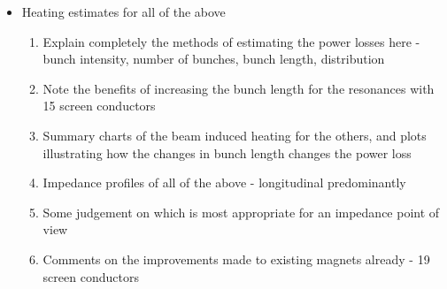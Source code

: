 \begin{itemize}
\item{Heating estimates for all of the above}
\begin{enumerate}
\item{Explain completely the methods of estimating the power losses here - bunch intensity, number of bunches, bunch length, distribution}
\item{Note the benefits of increasing the bunch length for the resonances with 15 screen conductors}
\item{Summary charts of the beam induced heating for the others, and plots illustrating how the changes in bunch length changes the power loss}
\item{Impedance profiles of all of the above - longitudinal predominantly}
\item{Some judgement on which is most appropriate for an impedance point of view}
\item{Comments on the improvements made to existing magnets already - 19 screen conductors}
\end{enumerate}
\end{itemize}
%
%
%
%

